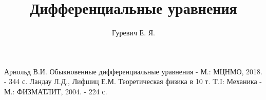 \documentclass{article}
\author{Гуревич Е. Я.}
\title{Дифференциальные уравнения}
\date{}
\begin{document}
%
\maketitle
\tableofcontents
\newpage
















\newpage
\begin{thebibliography}{3}
Арнольд В.И. Обыкновенные дифференциальные уравнения - М.: МЦНМО, 2018. - 344 с.
Ландау Л.Д., Лифшиц Е.М. Теоретическая физика в 10 т. T.I: Механика - М.:
ФИЗМАТЛИТ, 2004. - 224 с.
\end{thebibliography}
\end{document}
